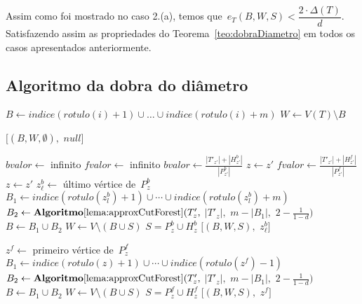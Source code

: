 	Assim como foi mostrado no caso 2.(a), temos 
	que~${e_T(B,W,S)<\dfrac{2\cdot \Delta(T)}{d}}$.
	Satisfazendo assim as propriedades do Teorema~\ref{teo:dobraDiametro} em todos os casos apresentados anteriormente.

	


	\bigskip
	\bigskip
	\bigskip

	\subsection{Algoritmo da dobra do diâmetro}
	\begin{algorithm}[H]
	\label{alg:dobraDiametro}

		\caption{}
		{
			{
				$B\gets indice(rotulo(i)+1)\cup\ldots\cup indice(rotulo(i)+m)$\;
				$W\gets V(T)\setminus B$\;

				\Return $[(B,W,\emptyset),$ $null]$\;
			}
		}
		$bvalor \gets$ infinito \;
		$fvalor \gets$ infinito\;
		{
			{
			 	$bvalor \gets \frac{|T'_{z'}|+|H_{z'}^b|}{|P^b_{z'}|}$\;
			 	$z \gets z'$\; 
			}
		}
		{
			{
			 	$fvalor \gets \frac{|T'_{z'}|+|H_{z'}^f|}{|P^f_{z'}|}$\;
			 	$z \gets z'$\; 
			}
		}
		\newpage
		{
			$z^b_\ell \gets $ último vértice de~$P_z^b$\;
			$B_1 \gets indice(rotulo(z^b_l)+1)\cup\cdots\cup indice(rotulo(z^b_l)+m)$\;
			$B_2 \gets \mathbf {Algoritmo\ref{lema:approxCutForest}}(T'_z,$ $|T'_z|,$ $m-|B_1|,$ $2-\frac{1}{1-d})$\;
			$B \gets B_1\cup B_2$\;
			$W \gets V\setminus (B\cup S)$\; 
			$S = P_z^b\cup H^b_z $\;
			\Return $[(B,W,S),$ $z^b_\ell]$\;
		}

	\end{algorithm}	

	\LinesNumberedHidden
	\begin{algorithm}[H]
	\label{alg:dobraDiametro}
	\Numberline
		\Else
		{
			\Numberline$z^f \gets $ primeiro vértice de~$P_z^f$\;
			\Numberline$B_1 \gets indice(rotulo(z)+1)\cup\cdots\cup indice(rotulo(z^f)-1)$\;
			\Numberline$B_2 \gets \mathbf {Algoritmo\ref{lema:approxCutForest}}(T'_z,$ $|T'_z|,$ $m-|B_1|,$ $2-\frac{1}{1-d})$\;
			\Numberline$B \gets B_1\cup B_2$\;
			\Numberline$W \gets V\setminus (B\cup S)$\; 
			\Numberline$S = P_z^f\cup H^f_z $\;
			\Numberline\Return $[(B,W,S),$ $z^f]$\;		

		}

	\end{algorithm}	